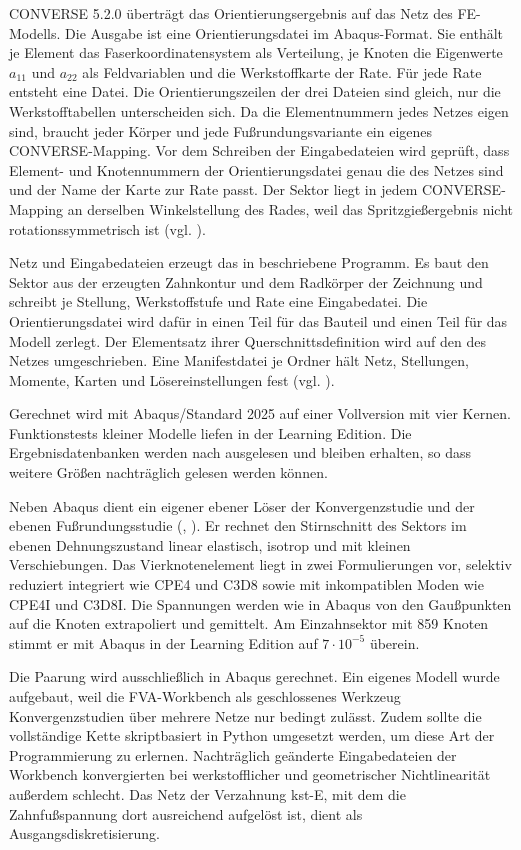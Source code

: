 CONVERSE 5.2.0 überträgt das Orientierungsergebnis auf das Netz des FE-Modells. Die Ausgabe ist eine Orientierungsdatei im Abaqus-Format. Sie enthält je Element das Faserkoordinatensystem als Verteilung, je Knoten die Eigenwerte $a_{11}$ und $a_{22}$ als Feldvariablen und die Werkstoffkarte der Rate. Für jede Rate entsteht eine Datei. Die Orientierungszeilen der drei Dateien sind gleich, nur die Werkstofftabellen unterscheiden sich. Da die Elementnummern jedes Netzes eigen sind, braucht jeder Körper und jede Fußrundungsvariante ein eigenes CONVERSE-Mapping. Vor dem Schreiben der Eingabedateien wird geprüft, dass Element- und Knotennummern der Orientierungsdatei genau die des Netzes sind und der Name der Karte zur Rate passt. Der Sektor liegt in jedem CONVERSE-Mapping an derselben Winkelstellung des Rades, weil das Spritzgießergebnis nicht rotationssymmetrisch ist (vgl. ).

Netz und Eingabedateien erzeugt das in  beschriebene Programm. Es baut den Sektor aus der erzeugten Zahnkontur und dem Radkörper der Zeichnung und schreibt je Stellung, Werkstoffstufe und Rate eine Eingabedatei. Die Orientierungsdatei wird dafür in einen Teil für das Bauteil und einen Teil für das Modell zerlegt. Der Elementsatz ihrer Querschnittsdefinition wird auf den des Netzes umgeschrieben. Eine Manifestdatei je Ordner hält Netz, Stellungen, Momente, Karten und Lösereinstellungen fest (vgl. ).

Gerechnet wird mit Abaqus/Standard 2025 auf einer Vollversion mit vier Kernen. Funktionstests kleiner Modelle liefen in der Learning Edition. Die Ergebnisdatenbanken werden nach  ausgelesen und bleiben erhalten, so dass weitere Größen nachträglich gelesen werden können.

Neben Abaqus dient ein eigener ebener Löser der Konvergenzstudie und der ebenen Fußrundungsstudie (, ). Er rechnet den Stirnschnitt des Sektors im ebenen Dehnungszustand linear elastisch, isotrop und mit kleinen Verschiebungen. Das Vierknotenelement liegt in zwei Formulierungen vor, selektiv reduziert integriert wie CPE4 und C3D8 sowie mit inkompatiblen Moden wie CPE4I und C3D8I. Die Spannungen werden wie in Abaqus von den Gaußpunkten auf die Knoten extrapoliert und gemittelt. Am Einzahnsektor mit 859 Knoten stimmt er mit Abaqus in der Learning Edition auf $7 \cdot 10^{-5}$ überein.

Die Paarung wird ausschließlich in Abaqus gerechnet. Ein eigenes Modell wurde aufgebaut, weil die FVA-Workbench als geschlossenes Werkzeug Konvergenzstudien über mehrere Netze nur bedingt zulässt. Zudem sollte die vollständige Kette skriptbasiert in Python umgesetzt werden, um diese Art der Programmierung zu erlernen. Nachträglich geänderte Eingabedateien der Workbench konvergierten bei werkstofflicher und geometrischer Nichtlinearität außerdem schlecht. Das Netz der Verzahnung kst-E, mit dem die Zahnfußspannung dort ausreichend aufgelöst ist, dient als Ausgangsdiskretisierung.

